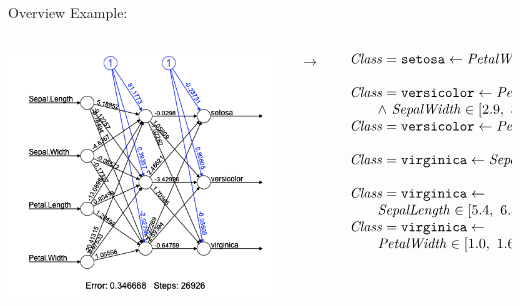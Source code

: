 \documentclass[presentation]{beamer}\mode<presentation>{\usetheme{AMSBolognaFC}}
\begin{document}
\begin{frame}[allowframebreaks]{Overview}
    Example:
    \begin{columns}
        \begin{column}{.43\linewidth}
            \includegraphics[width=\linewidth]{figures/nn-iris.png}
        \end{column}
        $\rightarrow$
        \begin{column}{.53\linewidth}\small
            \[ 
                \begin{array}{l}
                    \variable{Class} = \functor{setosa} \leftarrow \variable{PetalWidth} \leq 1.0 \fullstop
                    \\
                    \\
                    \variable{Class} = \functor{versicolor} \leftarrow \variable{PetalLength} > 4.9 \\ 
                        \qquad  \wedge\ \variable{SepalWidth} \in [2.9,\ 3.2] \fullstop
                    \\
                    \variable{Class} = \functor{versicolor} \leftarrow  \variable{PetalWidth} > 1.6 \fullstop
                    \\
                    \\
                    \variable{Class} = \functor{virginica} \leftarrow \variable{SepalWidth} \leq 2.9 \fullstop
                    \\
                    \\
                    \variable{Class} = \functor{virginica} \leftarrow \\ 
                        \qquad \variable{SepalLength} \in [5.4,\ 6.3] \fullstop
                    \\
                    \variable{Class} = \functor{virginica} \leftarrow \\ 
                        \qquad \variable{PetalWidth} \in [1.0,\ 1.6] \fullstop
                \end{array}    
            \]
        \end{column}
    \end{columns}
\end{frame}
\end{document}
